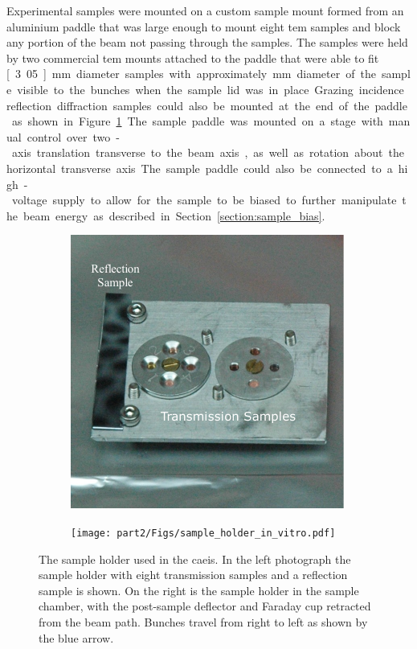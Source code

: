 Experimental samples were mounted on a custom sample mount formed from an aluminium paddle that was large enough to mount eight \gls{tem} samples and block any portion of the beam not passing through the samples.
The samples were held by two commercial \gls{tem} mounts attached to the paddle that were able to fit \unit[3.05]{mm} diameter samples with approximately \unit[2]{mm} diameter of the sample visible to the bunches when the sample lid was in place.
Grazing incidence reflection diffraction samples could also be mounted at the end of the paddle as shown in Figure~\ref{figure:sample_holder}.
The sample paddle was mounted on a stage with manual control over two-axis translation transverse to the beam axis, as well as rotation about the horizontal transverse axis.
The sample paddle could also be connected to a high-voltage supply to allow for the sample to be biased to further manipulate the beam energy as described in Section~\ref{section:sample_bias}.

\begin{figure}
    \centering
    \begin{subfigure}{0.49\linewidth}
    \centering
    \includegraphics[width=\linewidth]{part2/Figs/sample_holder_alone.pdf}
    \end{subfigure}
    \begin{subfigure}{0.49\linewidth}
    \centering
    \texttt{[image: part2/Figs/sample\_holder\_in\_vitro.pdf]}
    \end{subfigure}
    \caption[Sample holder.]{The sample holder used in the \gls{caeis}. In the left photograph the sample holder with eight transmission samples and a reflection sample is shown. On the right is the sample holder in the sample chamber, with the post-sample deflector and Faraday cup retracted from the beam path. Bunches travel from right to left as shown by the blue arrow.}
    \label{figure:sample_holder}
\end{figure}

